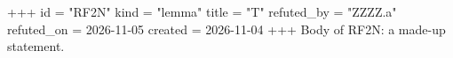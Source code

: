 +++
id = "RF2N"
kind = "lemma"
title = "T"
refuted_by = "ZZZZ.a"
refuted_on = 2026-11-05
created = 2026-11-04
+++
Body of RF2N: a made-up statement.
